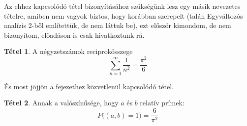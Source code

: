 \documentclass[12pt]{book}
\theoremstyle{plain} %
\theoremstyle{definition} %
\newtheorem{theo/}{Tétel}[section]
\newenvironment{theo}
  {\renewcommand{\qedsymbol}{$\clubsuit$}%
   \pushQED{\qed}\begin{theo/}}
  {\popQED\end{theo/}}
\theoremstyle{remark}
\renewcommand\qedsymbol{$\blacksquare$}
\numberwithin{equation}{section}  %
\begin{document}
	Az ehhez kapcsolódó tétel bizonyításához szükségünk lesz egy másik nevezetes tételre, amiben nem vagyok biztos, hogy korábban szerepelt (talán Egyváltozós analízis 2-ből említettük, de nem láttuk be), ezt először kimondom, de nem bizonyítom, előadáson is csak hivatkoztunk rá.
	
	\begin{theo}
		A négyzetszámok reciprokösszege
		\[ \sum\limits_{n = 1}^{\infty} \dfrac{1}{n^2} =   \dfrac{\pi^2}{6} \]
	\end{theo}

	És most jöjjön a fejezethez közvetlenül kapcsolódó tétel.
	
	\begin{theo}
		Annak a valószínűsége, hogy $a$ és $b$ relatív prímek:
		\[ P\Big( (a,b) = 1 \Big) = \dfrac{6}{\pi^2}  \]
	\end{theo}
\end{document}
